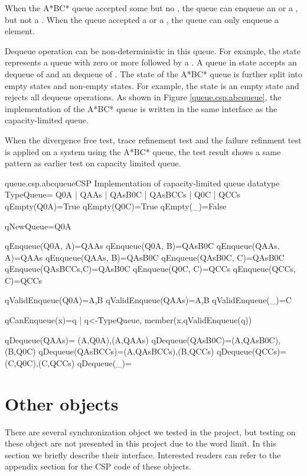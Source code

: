 \documentclass[a4paper, 12pt]{article}
\begin{document}
When the A*BC* queue accepted some  but no , the queue can enqueue an  or a , but not a . When the queue accepted a  or a , the queue can only enqueue a  element. 

Dequeue operation can be non-deterministic in this queue. For example, the state  represents a queue with zero or more  followed by a . A queue in state  accepts an dequeue of  and an dequeue of . The state of the A*BC* queue is further split into empty states and non-empty states. For example, the state  is an empty state and rejects all dequeue operations. As shown in Figure \ref{queue.csp.abcqueue}, the implementation of the A*BC* queue is written in the same interface as the capacity-limited queue.

When the divergence free test, trace refinement test and the failure refinment test is applied on a system using the A*BC* queue, the test result shows a same pattern as earlier test on capacity limited queue. 
\begin{cspfloat}{queue.csp.abcqueue}{CSP Implementation of capacity-limited queue}
datatype TypeQueue= Q0A | QAAs | QAsB0C | QAsBCCs | Q0C  | QCCs
qEmpty(Q0A)=True
qEmpty(Q0C)=True
qEmpty(_)=False

qNewQueue=Q0A

qEnqueue(Q0A,    A)=QAAs
qEnqueue(Q0A,    B)=QAsB0C
qEnqueue(QAAs,   A)=QAAs
qEnqueue(QAAs,   B)=QAsB0C
qEnqueue(QAsB0C, C)=QAsB0C
qEnqueue(QAsBCCs,C)=QAsB0C
qEnqueue(Q0C,    C)=QCCs
qEnqueue(QCCs,   C)=QCCs

qValidEnqueue(Q0A)={A,B}
qValidEnqueue(QAAs)={A,B}
qValidEnqueue(_)={C}

qCanEnqueue(x)={q | q<-TypeQueue, member(x,qValidEnqueue(q))}

qDequeue(QAAs)=  {(A,Q0A),(A,QAAs)}
qDequeue(QAsB0C)={(A,QAsB0C),(B,Q0C)}
qDequeue(QAsBCCs)={(A,QAsBCCs),(B,QCCs)}
qDequeue(QCCs)={(C,Q0C),(C,QCCs)}
qDequeue(_)={}
\end{cspfloat}

\newpage
\section{Other objects}
There are several synchronization object we tested in the project, but testing on these object are not presented in this project due to the word limit. In this section we briefly describe their interface. Interested readers can refer to the appendix section for the CSP code of these objects.
\end{document}
